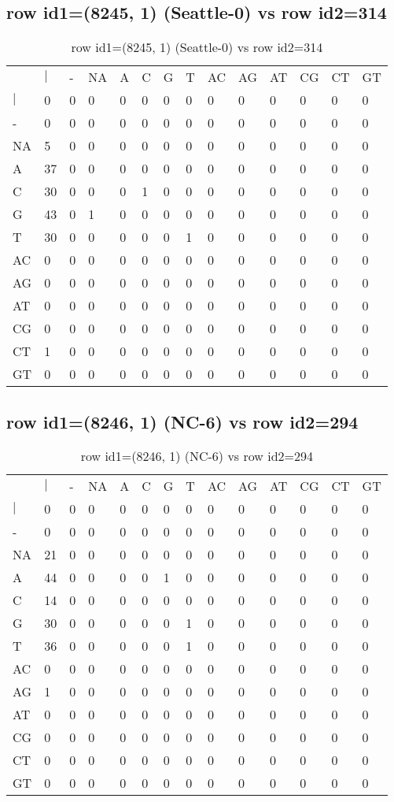\subsection{row id1=(8245, 1) (Seattle-0) vs row id2=314}
\begin{center}
\begin{longtable}{|l|l|l|l|l|l|l|l|l|l|l|l|l|l|}
\caption{row id1=(8245, 1) (Seattle-0) vs row id2=314} \label{table_dm376}\\
\hline
\\
\hline
&$|$&-&NA&A&C&G&T&AC&AG&AT&CG&CT&GT\\
$|$&0&0&0&0&0&0&0&0&0&0&0&0&0\\
-&0&0&0&0&0&0&0&0&0&0&0&0&0\\
NA&5&0&0&0&0&0&0&0&0&0&0&0&0\\
A&37&0&0&0&0&0&0&0&0&0&0&0&0\\
C&30&0&0&0&1&0&0&0&0&0&0&0&0\\
G&43&0&1&0&0&0&0&0&0&0&0&0&0\\
T&30&0&0&0&0&0&1&0&0&0&0&0&0\\
AC&0&0&0&0&0&0&0&0&0&0&0&0&0\\
AG&0&0&0&0&0&0&0&0&0&0&0&0&0\\
AT&0&0&0&0&0&0&0&0&0&0&0&0&0\\
CG&0&0&0&0&0&0&0&0&0&0&0&0&0\\
CT&1&0&0&0&0&0&0&0&0&0&0&0&0\\
GT&0&0&0&0&0&0&0&0&0&0&0&0&0\\
\hline
\end{longtable}
\end{center}

\subsection{row id1=(8246, 1) (NC-6) vs row id2=294}
\begin{center}
\begin{longtable}{|l|l|l|l|l|l|l|l|l|l|l|l|l|l|}
\caption{row id1=(8246, 1) (NC-6) vs row id2=294} \label{table_dm378}\\
\hline
\\
\hline
&$|$&-&NA&A&C&G&T&AC&AG&AT&CG&CT&GT\\
$|$&0&0&0&0&0&0&0&0&0&0&0&0&0\\
-&0&0&0&0&0&0&0&0&0&0&0&0&0\\
NA&21&0&0&0&0&0&0&0&0&0&0&0&0\\
A&44&0&0&0&0&1&0&0&0&0&0&0&0\\
C&14&0&0&0&0&0&0&0&0&0&0&0&0\\
G&30&0&0&0&0&0&1&0&0&0&0&0&0\\
T&36&0&0&0&0&0&1&0&0&0&0&0&0\\
AC&0&0&0&0&0&0&0&0&0&0&0&0&0\\
AG&1&0&0&0&0&0&0&0&0&0&0&0&0\\
AT&0&0&0&0&0&0&0&0&0&0&0&0&0\\
CG&0&0&0&0&0&0&0&0&0&0&0&0&0\\
CT&0&0&0&0&0&0&0&0&0&0&0&0&0\\
GT&0&0&0&0&0&0&0&0&0&0&0&0&0\\
\hline
\end{longtable}
\end{center}

